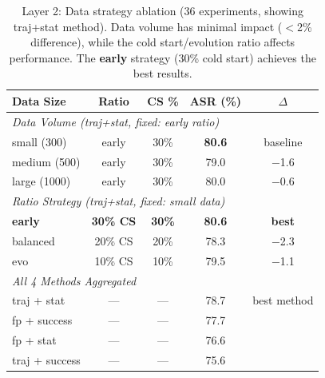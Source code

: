 \begin{table}[t]
\centering
\caption{Layer 2: Data strategy ablation (36 experiments, showing traj+stat method). Data volume has minimal impact ($<$2\% difference), while the cold start/evolution ratio affects performance. The \textbf{early} strategy (30\% cold start) achieves the best results.}
\label{tab:layer2}
\small
\begin{tabular}{lcccc}
\toprule
\textbf{Data Size} & \textbf{Ratio} & \textbf{CS \%} & \textbf{ASR (\%)} & \textbf{$\Delta$} \\
\midrule
\multicolumn{5}{l}{\textit{Data Volume (traj+stat, fixed: early ratio)}} \\
small (300) & early & 30\% & \textbf{80.6} & baseline \\
medium (500) & early & 30\% & 79.0 & $-$1.6 \\
large (1000) & early & 30\% & 80.0 & $-$0.6 \\
\midrule
\multicolumn{5}{l}{\textit{Ratio Strategy (traj+stat, fixed: small data)}} \\
\textbf{early} & \textbf{30\% CS} & \textbf{30\%} & \textbf{80.6} & \textbf{best} \\
balanced & 20\% CS & 20\% & 78.3 & $-$2.3 \\
evo & 10\% CS & 10\% & 79.5 & $-$1.1 \\
\midrule
\multicolumn{5}{l}{\textit{All 4 Methods Aggregated}} \\
traj + stat & --- & --- & 78.7 & best method \\
fp + success & --- & --- & 77.7 & \\
fp + stat & --- & --- & 76.6 & \\
traj + success & --- & --- & 75.6 & \\
\bottomrule
\end{tabular}
\end{table}
